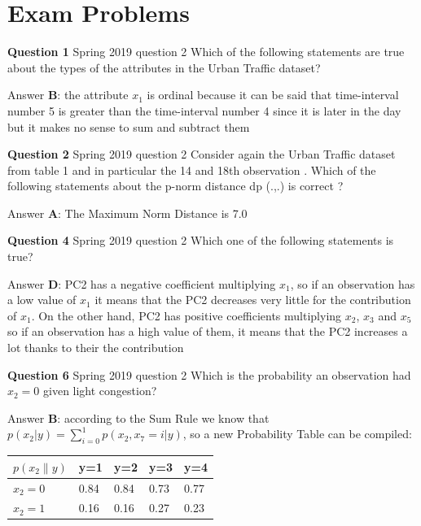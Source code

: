 \documentclass[
]{article}
\begin{document}
\newpage

\section{Exam Problems}\label{exam-problems}

\textbf{Question 1} \textbar{} Spring 2019 question 2 Which of the
following statements are true about the types of the attributes in the
Urban Traffic dataset?

Answer \textbf{B}: the attribute \(x_1\) is ordinal because it can be
said that time-interval number 5 is greater than the time-interval
number 4 since it is later in the day but it makes no sense to sum and
subtract them

\textbf{Question 2} \textbar{} Spring 2019 question 2 Consider again the
Urban Traffic dataset from table 1 and in particular the 14 and 18th
observation . Which of the following statements about the p-norm
distance dp (.,.) is correct ?

Answer \textbf{A}: The Maximum Norm Distance is 7.0

\textbf{Question 4} \textbar{} Spring 2019 question 2 Which one of the
following statements is true?

Answer \textbf{D}: PC2 has a negative coefficient multiplying \(x_1\),
so if an observation has a low value of \(x_1\) it means that the PC2
decreases very little for the contribution of \(x_1\). On the other
hand, PC2 has positive coefficients multiplying \(x_2\), \(x_3\) and
\(x_5\) so if an observation has a high value of them, it means that the
PC2 increases a lot thanks to their the contribution

\textbf{Question 6} \textbar{} Spring 2019 question 2 Which is the
probability an observation had \(\hat{x}_2=0\) given light congestion?

Answer \textbf{B}: according to the Sum Rule we know that
\(p(x_2|y)=\sum_{i=0}^1 p(x_2,x_7=i|y)\), so a new Probability Table can
be compiled:

\begin{longtable}[]{@{}lllll@{}}
\toprule\noalign{}
\(p(x_2\|y)\) & y=1 & y=2 & y=3 & y=4 \\
\midrule\noalign{}
\endhead
\bottomrule\noalign{}
\endlastfoot
\(x_2=0\) & 0.84 & 0.84 & 0.73 & 0.77 \\
\(x_2=1\) & 0.16 & 0.16 & 0.27 & 0.23 \\
\end{longtable}

\newpage
\end{document}
